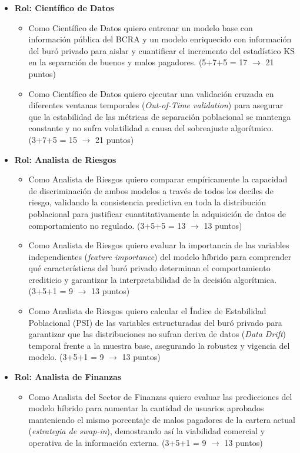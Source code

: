 \documentclass[
11pt, %
]{charter}
\begin{document}
\begin{itemize}

    \item \textbf{Rol: Científico de Datos}
    \begin{itemize}
        \item Como Científico de Datos quiero entrenar un modelo base con información pública del BCRA y un modelo enriquecido con información del buró privado para aislar y cuantificar el incremento del estadístico KS en la separación de buenos y malos pagadores. (5+7+5 = 17 $\rightarrow$ 21 puntos)

        \item Como Científico de Datos quiero ejecutar una validación cruzada en diferentes ventanas temporales (\textit{Out-of-Time validation}) para asegurar que la estabilidad de las métricas de separación poblacional se mantenga constante y no sufra volatilidad a causa del sobreajuste algorítmico. (3+7+5 = 15 $\rightarrow$ 21 puntos)
    \end{itemize}

    \item \textbf{Rol: Analista de Riesgos}
    \begin{itemize}
        \item Como Analista de Riesgos quiero comparar empíricamente la capacidad de discriminación de ambos modelos a través de todos los deciles de riesgo, validando la consistencia predictiva en toda la distribución poblacional para justificar cuantitativamente la adquisición de datos de comportamiento no regulado. (3+5+5 = 13 $\rightarrow$ 13 puntos)

        \item Como Analista de Riesgos quiero evaluar la importancia de las variables independientes (\textit{feature importance}) del modelo híbrido para comprender qué características del buró privado determinan el comportamiento crediticio y garantizar la interpretabilidad de la decisión algorítmica. (3+5+1 = 9 $\rightarrow$ 13 puntos)

        \item Como Analista de Riesgos quiero calcular el Índice de Estabilidad Poblacional (PSI) de las variables estructuradas del buró privado para garantizar que las distribuciones no sufran deriva de datos (\textit{Data Drift}) temporal frente a la muestra base, asegurando la robustez y vigencia del modelo. (3+5+1 = 9 $\rightarrow$ 13 puntos)
    \end{itemize}

    \item \textbf{Rol: Analista de Finanzas}
    \begin{itemize}
        \item Como Analista del Sector de Finanzas quiero evaluar las predicciones del modelo híbrido para aumentar la cantidad de usuarios aprobados manteniendo el mismo porcentaje de malos pagadores de la cartera actual (\textit{estrategia de swap-in}), demostrando así la viabilidad comercial y operativa de la información externa. (3+5+1 = 9 $\rightarrow$ 13 puntos)
    \end{itemize}


\end{itemize}
\end{document}
